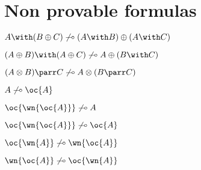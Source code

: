 \section{Non provable formulas}\label{non-provable-formulas}

\(A \with (B\plus C) \not\limp (A\with B)\plus (A\with C)\)

\((A\plus B)\with (A\plus C) \not\limp A\plus (B\with C)\)

\((A\tens B)\parr C \not\limp A\tens (B\parr C)\)

\(A \not\limp \oc{A}\)

\(\oc{\wn{\oc{A}}} \not\limp A\)

\(\oc{\wn{\oc{A}}} \not\limp \oc{A}\)

\(\oc{\wn{A}} \not\limp \wn{\oc{A}}\)

\(\wn{\oc{A}} \not\limp \oc{\wn{A}}\)


